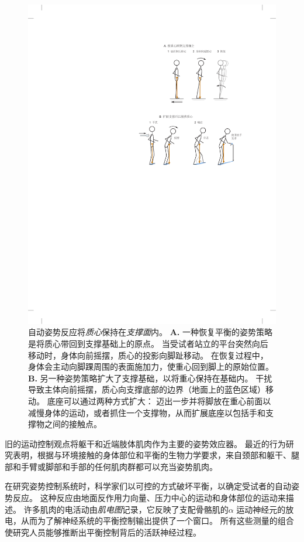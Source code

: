 \begin{figure}[htbp]
	\centering
	\includegraphics[width=1.0\linewidth]{chap36/fig_36_2}
	\caption{自动姿势反应将\textit{质心}保持在\textit{支撑面}内。
		\textbf{A.} 一种恢复平衡的姿势策略是将质心带回到支撑基础上的原点。
		当受试者站立的平台突然向后移动时，身体向前摇摆，质心的投影向脚趾移动。
		在恢复过程中，身体会主动向脚踝周围的表面施加力，使重心回到脚上的原始位置。
		\textbf{B.} 另一种姿势策略扩大了支撑基础，以将重心保持在基础内。
		干扰导致主体向前摇摆，质心向支撑底部的边界（地面上的蓝色区域）移动。
		底座可以通过两种方式扩大：
		迈出一步并将脚放在重心前面以减慢身体的运动，或者抓住一个支撑物，从而扩展底座以包括手和支撑物之间的接触点。}
	\label{fig:36_2}
\end{figure}


旧的运动控制观点将躯干和近端肢体肌肉作为主要的姿势效应器。
最近的行为研究表明，根据与环境接触的身体部位和平衡的生物力学要求，来自颈部和躯干、腿部和手臂或脚部和手部的任何肌肉群都可以充当姿势肌肉。


在研究姿势控制系统时，科学家们以可控的方式破坏平衡，以确定受试者的自动姿势反应。
这种反应由地面反作用力向量、压力中心的运动和身体部位的运动来描述。
许多肌肉的电活动由\textit{肌电图}记录，它反映了支配骨骼肌的$ \alpha $ 运动神经元的放电，从而为了解神经系统的平衡控制输出提供了一个窗口。
所有这些测量的组合使研究人员能够推断出平衡控制背后的活跃神经过程。




